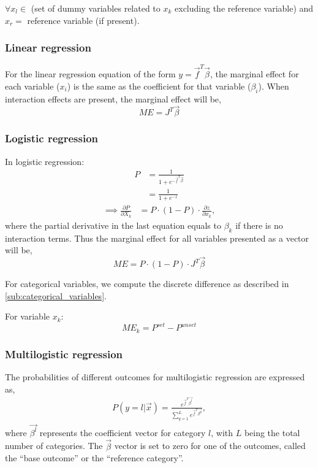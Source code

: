 $\forall x_l \in$ (set of dummy variables related to $x_k$ excluding the reference variable) and
$x_r = $ reference variable (if present).

\subsubsection{Linear regression} %
\label{ssub:linear_regression}
For the linear regression equation of the form $y = \vec{f}^T \vec{\beta}$,
the marginal effect for each variable ($x_i$) is the same as the coefficient for
that variable ($\beta_i$). When interaction effects are present, the marginal effect
will be,
$$
    \mathit{ME} = J^T \vec{\beta}
$$
\subsubsection{Logistic regression} %
\label{ssub:logistic_regression}
In logistic regression:
\begin{align*}
    P &= \frac{1}{1 + e^{-\vec{f}^T \vec{\beta}}} \\
    &= \frac{1}{1 + e^{-z}}
\end{align*}
\begin{align*}
  \implies \frac{\partial P}{\partial X_k} &= P \cdot (1-P) \cdot
  \frac{\partial z}{\partial x_k},
\end{align*}
where the partial derivative in the last equation equals to $\beta_k$
if there is no interaction terms. Thus the marginal effect for all variables
presented as a vector will be,
$$
    \mathit{ME} = P \cdot (1-P) \cdot J^T \vec{\beta}
$$

For categorical variables, we compute the discrete difference as described in
\ref{sub:categorical_variables}.

For variable $x_k$:
$$
    \mathit{ME_k} = P^{set} - P^{unset}
$$

\subsubsection{Multilogistic regression} %
\label{ssub:multilogistic_regression}
The probabilities of different outcomes for multilogistic regression are expressed as,
\begin{gather*}
    P(y=l | \vec{x})  = \frac{e^{\vec{f}^T \vec{\beta^l}}}{\displaystyle \sum_{q=1}^{L} e^{\vec{f}^T \vec{\beta^q}}},
\end{gather*}
where $\vec{\beta^l}$ represents the coefficient vector for category $l$,
with $L$ being the total number of categories. The $\vec{\beta}$ vector is set to zero for one of the
outcomes, called the ``base outcome'' or the ``reference category''.


